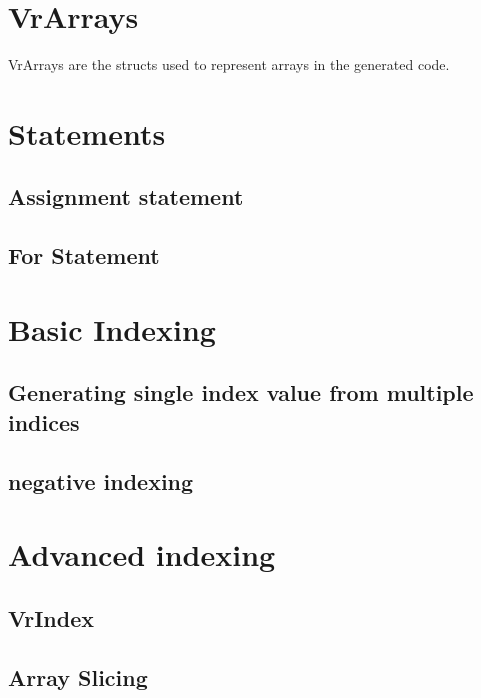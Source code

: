 \section{VrArrays}
\label{sec:vrarray}
VrArrays are the structs used to represent arrays in the generated code. 
\section{Statements}
\subsection{Assignment statement}
\subsection{For Statement}
\section{Basic Indexing}
\subsection{ Generating single index value from multiple indices}
\subsection{negative indexing}
\section{Advanced indexing}
\subsection{VrIndex}
\subsection{Array Slicing}
